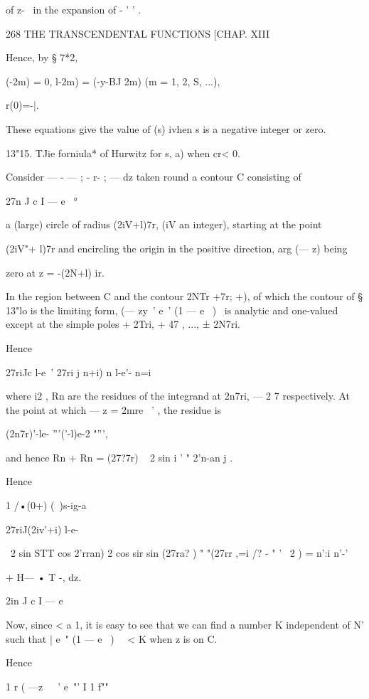 of z-~  in the expansion of -  ' ' . 



268 THE TRANSCENDENTAL FUNCTIONS [CHAP. XIII 

Hence, by § 7*2, 

 (-2m) = 0,   l-2m) = (-y-BJ 2m) (m = 1, 2, S, ...), 

r(0)=-|. 

These equations give the value of   (s) ivhen s is a negative integer or zero. 

13"15. TJie forniula* of Hurwitz for   s, a) when cr< 0. 

Consider — - — ; - r-  ; — dz taken round a contour C consisting of 

27n J c I — e~  ° 

a (large) circle of radius (2iV+l)7r, (iV an integer), starting at the point 

(2iV"+ l)7r and encircling the origin in the positive direction, arg (— z) being 

zero at z = -(2N+l) ir. 

In the region between C and the contour  2NTr +7r; +), of which the 
contour of § 13"lo is the limiting form, (— zy~' e~'  (1 — e~ )~  is analytic and 
one-valued except at the simple poles + 2Tri, + 47 , ..., ± 2N7ri. 

Hence 



27riJc l-e~' 27ri j  n+i) n l-e'- n=i 

where i2 , Rn are the residues of the integrand at 2n7ri, — 2 7  respectively. 
At the point at which — z = 2mre~ ' , the residue is 

(2n7r)'-le- '''('-l)e-2 "''', 

and hence Rn + Rn = (27?7r) ~  2 sin i '  "  2'n-an j . 

Hence 

1 /•(0+) (\  )s-ig-a  



27riJ(2iv'+i)  l-e-  

\  2 sin  STT   cos  2'rran) 2 cos  sir   sin (27ra? ) 
" "(27rr ,=i /? -  " '  \ 2 ) = n':i n'-' 

+ H— • T -, dz. 

2in J c I — e   

Now, since < a   1, it is easy to see that we can find a number K 
independent of N' such that | e~"  (1 — e~ )~  \ < K when z is on C. 

Hence 

1 r ( —z\ \  ~'  e~"'  I 1 f"" 

